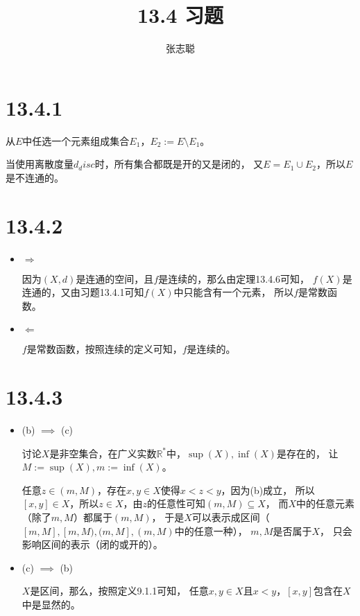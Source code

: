 \documentclass{article}
\begin{document}
\title{13.4 习题}
\author{张志聪}
\maketitle

\section*{13.4.1}

从$E$中任选一个元素组成集合$E_1$，$E_2 := E \setminus E_1$。

当使用离散度量$d_disc$时，所有集合都既是开的又是闭的，
又$E = E_1 \cup E_2$，所以$E$是不连通的。

\section*{13.4.2}

\begin{itemize}
  \item $\Rightarrow$

        因为$(X,d)$是连通的空间，且$f$是连续的，那么由定理13.4.6可知，
        $f(X)$是连通的，又由习题13.4.1可知$f(X)$中只能含有一个元素，
        所以$f$是常数函数。

  \item $\Leftarrow$

        $f$是常数函数，按照连续的定义可知，$f$是连续的。
\end{itemize}

\section*{13.4.3}

\begin{itemize}
  \item (b) $\implies$ (c)

        讨论$X$是非空集合，在广义实数$\mathbb{R}^{*}$中，$\sup(X), \inf(X)$是存在的，
        让$M := \sup(X), m := \inf(X)$。

        任意$z \in (m, M)$，存在$x, y \in X$使得$x < z < y$，因为(b)成立，
        所以$[x, y] \in X$，所以$z \in X$，由$z$的任意性可知$(m, M) \subseteq X$，
        而$X$中的任意元素（除了$m, M$）都属于$(m, M)$，
        于是$X$可以表示成区间（$[m, M], [m, M), (m, M], (m, M)$中的任意一种），
        $m, M$是否属于$X$，
        只会影响区间的表示（闭的或开的）。


  \item (c) $\implies$ (b)

        $X$是区间，那么，按照定义9.1.1可知， 任意$x, y \in X$且$x < y$，$[x, y]$包含在$X$中是显然的。
\end{itemize}
\end{document}
